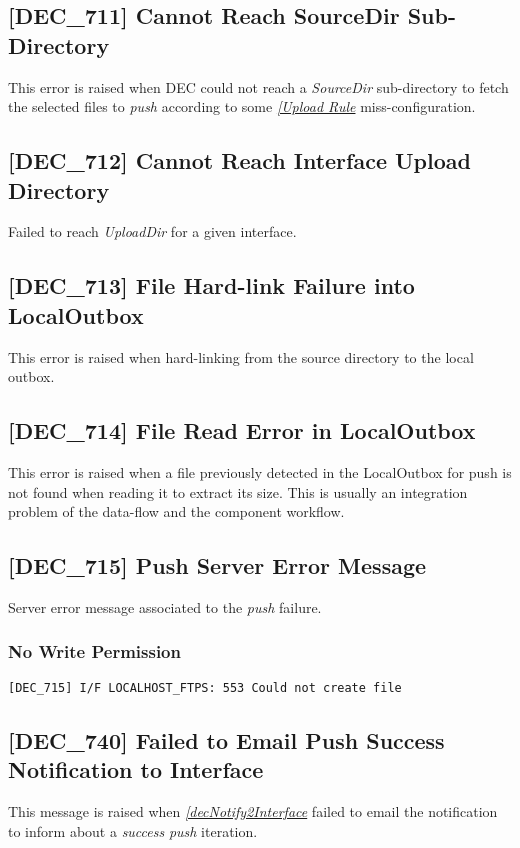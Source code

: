 \documentclass[dec_sum_main.tex]{subfiles}
\begin{document}
\label{DEC711}
\subsection{[DEC\_711] Cannot Reach SourceDir Sub-Directory}
This error is raised when DEC could not reach a \textit{SourceDir} sub-directory to fetch the selected files to \textit{push} according to some \hyperref[Upload Rules]{\textit{[Upload Rule}} miss-configuration.

\label{DEC712}
\subsection{[DEC\_712] Cannot Reach Interface Upload Directory}
Failed to reach \textit{UploadDir} for a given interface.

\label{DEC713}
\subsection{[DEC\_713] File Hard-link Failure into LocalOutbox}
This error is raised when hard-linking from the source directory to the local outbox.

\label{DEC714}
\subsection{[DEC\_714] File Read Error in LocalOutbox}
This error is raised when a file previously detected in the LocalOutbox for push is not found when reading it to extract its size. This is usually an integration problem of the data-flow and the component workflow.

\label{DEC715}
\subsection{[DEC\_715] Push Server Error Message}
Server error message associated to the \textit{push} failure. 

\subsubsection{No Write Permission }
\begin{verbatim}
[DEC_715] I/F LOCALHOST_FTPS: 553 Could not create file
\end{verbatim}

\label{DEC740}
\subsection{[DEC\_740] Failed to Email Push Success Notification to Interface}
This message is raised when \hyperref[decNotify2Interface]{\textit{[decNotify2Interface}} failed to email the notification to inform about a \textit{success} \textit{push} iteration.
\end{document}
